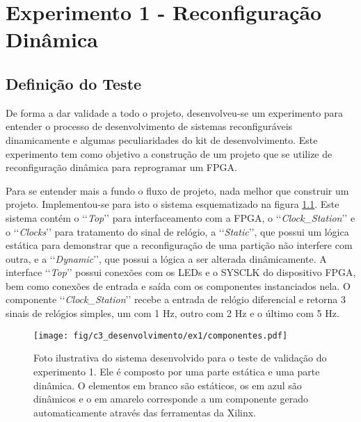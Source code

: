 \documentclass[11pt,a4paper,oneside]{book}
\begin{document}
	\frontmatter
	\tableofcontents
	\mainmatter
	
	\newcommand\qt[1]{\lq\lq{}#1\rq\rq{}}
	\newcommand\qti[1]{\lq\lq{}\textit{#1}\rq\rq{}}
\fi


\chapter{Experimento 1 - Reconfigura\c{c}\~ao Din\^amica}
\section{Definição do Teste}
\label{ex1:def}
De forma a dar validade a todo o projeto, desenvolveu-se um experimento para entender o processo de desenvolvimento de sistemas reconfiguráveis dinamicamente e algumas peculiaridades do kit de desenvolvimento.
Este experimento tem como objetivo a construção de um projeto que se utilize de reconfiguração dinâmica para reprogramar um FPGA.

Para se entender mais a fundo o fluxo de projeto, nada melhor que construir um projeto.
Implementou-se para isto o sistema esquematizado na figura \ref{fig:ex1:componentes}.
Este sistema contém o \qti{Top} para interfaceamento com a FPGA, o \qti{Clock\_Station} e o \qti{Clocks} para tratamento do sinal de relógio, a \qti{Static}, que possui um lógica estática para demonstrar que a reconfiguração de uma partição não interfere com outra, e a \qti{Dynamic}, que possui a lógica a ser alterada dinâmicamente.
A interface \qti{Top} possui conexões com os LEDs e o SYSCLK do dispositivo FPGA, bem como conexões de entrada e saída com os componentes instanciados nela.
O componente \qti{Clock\_Station} recebe a entrada de relógio diferencial e retorna 3 sinais de relógios simples, um com 1 Hz, outro com 2 Hz e o último com 5 Hz.

\begin{figure}[h]
\centering
\texttt{[image: fig/c3\_desenvolvimento/ex1/componentes.pdf]}
\caption{Foto ilustrativa do sistema desenvolvido para o teste de validação do experimento 1. Ele é composto por uma parte estática e uma parte dinâmica. O elementos em branco são estáticos, os em azul são dinâmicos e o em amarelo corresponde a um componente gerado automaticamente através das ferramentas da Xilinx.}
\label{fig:ex1:componentes}
\end{figure}
\end{document}
